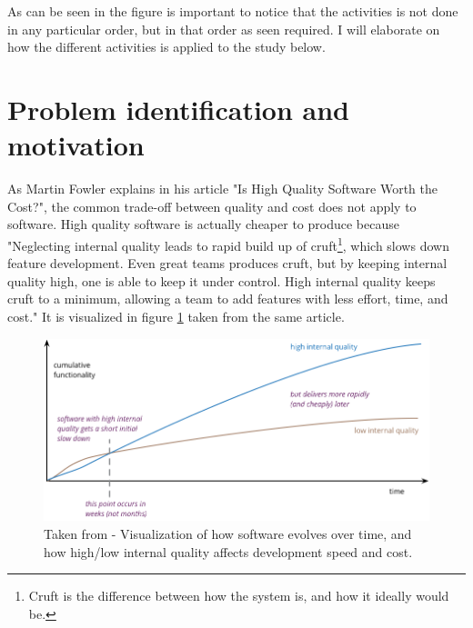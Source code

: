 \documentclass{report}
\begin{document}
As can be seen in the figure is important to notice that the activities is not done in any particular order, but in that order as seen required. I will elaborate on how the different activities is applied to the study below. 

\section{Problem identification and motivation}
\label{problem-identification-and-motiviation}

As Martin Fowler explains in his article "Is High Quality Software Worth the Cost?"\cite{is-high-quality-softaware-worth-it}, the common trade-off between quality and cost does not apply to software. High quality software is actually cheaper to produce because "Neglecting internal quality leads to rapid build up of cruft\footnote{Cruft is the difference between how the system is, and how it ideally would be.}, which slows down feature development. Even great teams produces cruft, but by keeping internal quality high, one is able to keep it under control. High internal quality keeps cruft to a minimum, allowing a team to add features with less effort, time, and cost." It is visualized in figure \ref{fig:internal-quality-graph} taken from the same article.

\begin{figure}[h!]
    \centering
    \includegraphics[width=\linewidth]{report/internal-quality-graph.png}
    \caption{Taken from \cite{is-high-quality-softaware-worth-it} - Visualization of how software evolves over time, and how high/low internal quality affects development speed and cost.}
    \label{fig:internal-quality-graph}
\end{figure}
\end{document}
